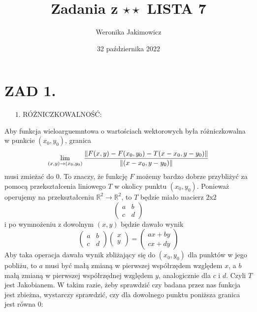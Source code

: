 \documentclass{article}[13pt]
\author{Weronika Jakimowicz}
\title{Zadania z $\star\star$ LISTA 7}
\date{32 października 2022}
\newcommand{\R}{\mathds{R}}
\begin{document}
\maketitle

\section*{ZAD 1.}

{\color{red}$\quad\;\;1$. RÓŻNICZKOWALNOŚĆ:}
\medskip

Aby funkcja wieloarguemntowa o wartościach wektorowych była różniczkowalna w punkcie $(x_0,y_0)$, granica
$$\lim\limits_{(x,y)\to(x_0,y_0)}{\|F(x,y)-F(x_0,y_0)-T(x-x_0,y-y_0)\|\over\|(x-x_0,y-y_0)\|}$$
musi zmieżać do 0. To znaczy, że funkcję $F$ możemy bardzo dobrze przybliżyć za pomocą przekształcenia liniowego $T$ w okolicy punktu $(x_0,y_0)$. Ponieważ operujemy na przekształceniu $\R^2\to\R^2$, to $T$ będzie miało macierz 2x2
$$\begin{pmatrix}a & b\\ c & d\end{pmatrix}$$
i po wymnożeniu z dowolnym $(x,y)$ będzie dawało wynik
$$\begin{pmatrix}
    a & b\\
    c & d
\end{pmatrix}
\begin{pmatrix}
    x\\y
\end{pmatrix}=\begin{pmatrix}
    ax+by\\
    cx+dy
\end{pmatrix}
$$
Aby taka operacja dawała wynik zbliżający się do $(x_0,y_0)$ dla punktów w jego pobliżu, to $a$ musi być małą zmianą w pierwszej współrzędem względem $x$, a $b$ małą zmianą w pierwszej współrzędnej względem $y$, analogicznie dla $c$ i $d$. Czyli $T$ jest Jakobianem. W takim razie, żeby sprawdzić czy badana przez nas funkcja jest zbieżna, wystarczy sprawdzić, czy dla dowolnego punktu poniższa granica jest równa 0:
\end{document}
